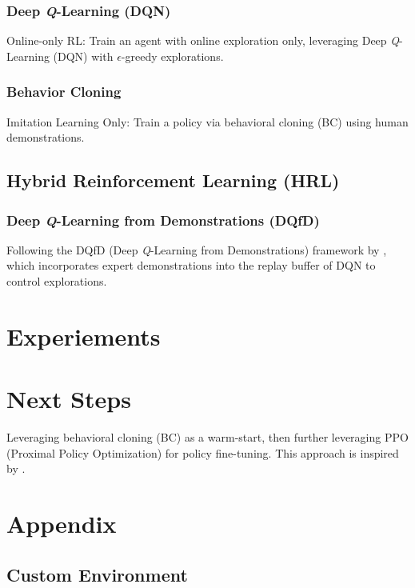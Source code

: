 \documentclass{article}
\begin{document}
\subsubsection{Deep \textit{Q}-Learning (DQN)}
Online-only RL: Train an agent with online exploration only, 
                  leveraging Deep \textit{Q}-Learning (DQN) with $\epsilon$-greedy 
                  explorations.
\subsubsection{Behavior Cloning}
Imitation Learning Only: Train a policy via behavioral 
                  cloning (BC) using human demonstrations.

\subsection{Hybrid Reinforcement Learning (HRL)}
\subsubsection{Deep \textit{Q}-Learning from Demonstrations (DQfD)}
Following the DQfD (Deep \textit{Q}-Learning from 
                  Demonstrations) framework by \cite{hester_dqfd_2017}, which 
                  incorporates expert demonstrations into the replay buffer of 
                  DQN to control explorations.

\section{Experiements}

\section{Next Steps}
Leveraging behavioral cloning (BC) as a warm-start, then 
                  further leveraging PPO (Proximal Policy Optimization) for 
                  policy fine-tuning. This approach is inspired by 
                  \cite{Coletti2023EffectivenessOW}.







\clearpage
\appendix
\onecolumn
\section{Appendix}
\subsection{Custom Environment}
\label{a1:custom_env}
\end{document}
